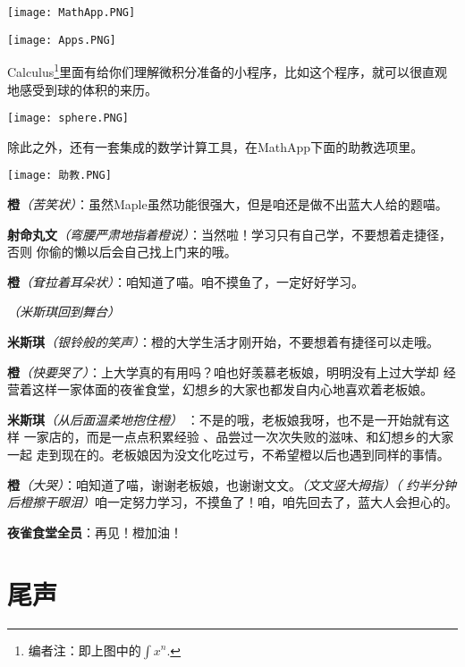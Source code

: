 \begin{multicols}{2}
    \begin{center}
        \texttt{[image: MathApp.PNG]}
    \end{center}
    \begin{center}
        \texttt{[image: Apps.PNG]}
    \end{center}

    Calculus\footnote{编者注：即上图中的$\textstyle\int
            x^n$.}里面有给你们理解微积分准备的小程序，比如这个程序，就可以很直观地感受到球的体积的来历。

    \begin{center}
        \texttt{[image: sphere.PNG]}
    \end{center}

    除此之外，还有一套集成的数学计算工具，在MathApp下面的助教选项里。
    \begin{center}
        \texttt{[image: 助教.PNG]}
    \end{center}

    \textbf{橙}\textit{（苦笑状）}：虽然Maple虽然功能很强大，但是咱还是做不出蓝大人给的题喵。

    \textbf{射命丸文}\textit{（弯腰严肃地指着橙说）}：当然啦！学习只有自己学，不要想着走捷径，否则
    你偷的懒以后会自己找上门来的哦。

    \textbf{橙}\textit{（耷拉着耳朵状）}：咱知道了喵。咱不摸鱼了，一定好好学习。

    \textit{（米斯琪回到舞台）}

    \textbf{米斯琪}\textit{（银铃般的笑声）}：橙的大学生活才刚开始，不要想着有捷径可以走哦。

    \textbf{橙}\textit{（快要哭了）}：上大学真的有用吗？咱也好羡慕老板娘，明明没有上过大学却
    经营着这样一家体面的夜雀食堂，幻想乡的大家也都发自内心地喜欢着老板娘。

    \textbf{米斯琪}\textit{（从后面温柔地抱住橙）}
    ：不是的哦，老板娘我呀，也不是一开始就有这样
    一家店的，而是一点点积累经验
    、品尝过一次次失败的滋味、和幻想乡的大家一起
    走到现在的。老板娘因为没文化吃过亏，不希望橙以后也遇到同样的事情。

    \textbf{橙}\textit{（大哭）}：咱知道了喵，谢谢老板娘，也谢谢文文。\textit{（文文竖大拇指）（
        约半分钟后橙擦干眼泪）}咱一定努力学习，不摸鱼了！咱，咱先回去了，蓝大人会担心的。

    \textbf{夜雀食堂全员}：再见！橙加油！

    \section*{尾声}


\end{multicols}
